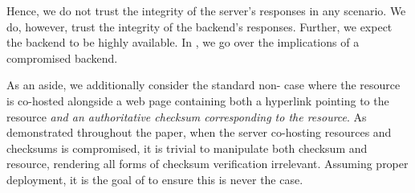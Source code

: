 Hence, we do not trust the integrity of the server's responses in any scenario.
We do, however, trust the integrity of the backend's responses. Further, we
expect the backend to be highly available. In , we go over
the implications of a compromised backend.

As an aside, we additionally consider the standard non-\SYSTEM{} case where the
resource is co-hosted alongside a web page containing both a hyperlink pointing
to the resource \emph{and an authoritative checksum corresponding to the
resource}. As demonstrated throughout the paper, when the server co-hosting
resources and checksums is compromised, it is trivial to manipulate both
checksum and resource, rendering all forms of checksum verification irrelevant.
Assuming proper deployment, it is the goal of \SYSTEM{} to ensure this is never
the case.
